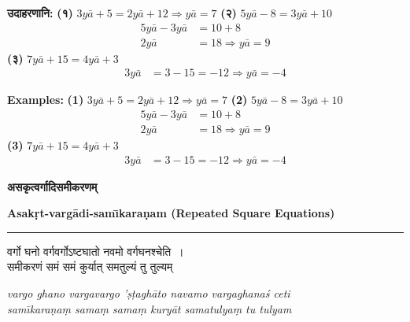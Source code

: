 \documentclass[11pt,a4paper]{article}
\newcommand{\dev}[1]{{\devanagarifont #1}}
\newcommand{\bicol}[2]{%
\noindent%
\begin{minipage}[t]{0.48\textwidth}
\begin{flushleft}
\small
#1
\end{flushleft}
\end{minipage}%
\hfill%
\begin{minipage}[t]{0.48\textwidth}
\begin{flushleft}
\small
#2
\end{flushleft}
\end{minipage}%
\vspace{0.4em}
}
\newcommand{\bicolverse}[2]{%
\par\noindent%
\begin{minipage}[t]{0.48\textwidth}
\centering
\color{versecolor}
\devanagarifont
\small
#1
\end{minipage}%
\hfill%
\begin{minipage}[t]{0.48\textwidth}
\centering
\color{versecolor}
\small
#2
\end{minipage}%
\par\vspace{0.4em}
}
\newcommand{\sectionbicol}[2]{%
\vspace{0.5em}
\noindent%
\begin{minipage}[t]{0.48\textwidth}
\begin{center}
\large\bfseries\color{sectioncolor}
\dev{#1}
\end{center}
\end{minipage}%
\hfill%
\begin{minipage}[t]{0.48\textwidth}
\begin{center}
\large\bfseries\color{sectioncolor}
#2
\end{center}
\end{minipage}%
\vspace{0.3em}
\noindent\rule{\textwidth}{0.4pt}
}
\begin{document}
\bicol{%
\textbf{उदाहरणानि:}
\vspace{0.2cm}
\textbf{(१)} $3y\bar{a} + 5 = 2y\bar{a} + 12 \Rightarrow y\bar{a} = 7$
\vspace{0.2cm}
\textbf{(२)} $5y\bar{a} - 8 = 3y\bar{a} + 10$
\begin{align*}
5y\bar{a} - 3y\bar{a} &= 10 + 8 \\
2y\bar{a} &= 18 \Rightarrow y\bar{a} = 9
\end{align*}
\textbf{(३)} $7y\bar{a} + 15 = 4y\bar{a} + 3$
\begin{align*}
3y\bar{a} &= 3 - 15 = -12 \Rightarrow y\bar{a} = -4
\end{align*}
}{%
\textbf{Examples:}
\vspace{0.2cm}
\textbf{(1)} $3y\bar{a} + 5 = 2y\bar{a} + 12 \Rightarrow y\bar{a} = 7$
\vspace{0.2cm}
\textbf{(2)} $5y\bar{a} - 8 = 3y\bar{a} + 10$
\begin{align*}
5y\bar{a} - 3y\bar{a} &= 10 + 8 \\
2y\bar{a} &= 18 \Rightarrow y\bar{a} = 9
\end{align*}
\textbf{(3)} $7y\bar{a} + 15 = 4y\bar{a} + 3$
\begin{align*}
3y\bar{a} &= 3 - 15 = -12 \Rightarrow y\bar{a} = -4
\end{align*}
}

\clearpage

\sectionbicol{असकृत्वर्गादिसमीकरणम्}{Asak\d{r}t-varg\={a}di-sam\={\i}kara\d{n}am (Repeated Square Equations)}

\vspace{0.3cm}

\bicolverse{%
वर्गो घनो वर्गवर्गोऽष्टघातो नवमो वर्गघनश्चेति~।\\
समीकरणं समं समं कुर्यात् समतुल्यं तु तुल्यम्~
}{%
\textit{vargo ghano vargavargo '\d{s}\d{t}agh\={a}to navamo vargaghana\'{s} ceti}\\
\textit{sam\={\i}kara\d{n}a\d{m} sama\d{m} sama\d{m} kury\={a}t samatulya\d{m} tu tulyam}
}

\vspace{0.5cm}
\end{document}

